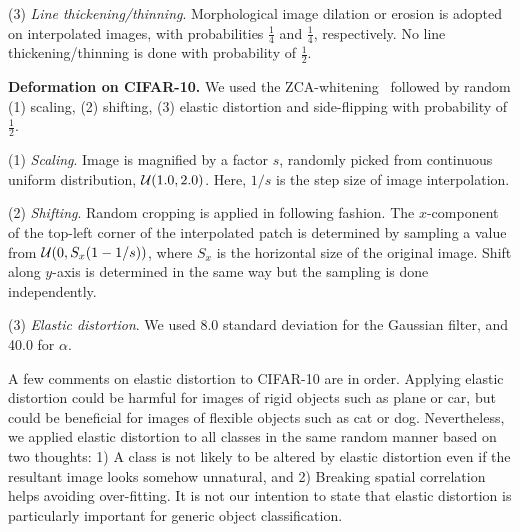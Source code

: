 \documentclass[10pt,twocolumn,letterpaper]{article}
\begin{document}
\noindent
(3) {\it Line thickening/thinning}.
Morphological image dilation or erosion is adopted on 
interpolated images, with probabilities $\frac{1}{4}$ and $\frac{1}{4}$,
respectively.
No line thickening/thinning is done with probability of $\frac{1}{2}$.

{\bf Deformation on CIFAR-10.}
We used the ZCA-whitening~\cite{KrizhevskyMasterThesis} 
followed by random (1) scaling, (2) shifting, (3) elastic distortion and side-flipping with probability of $\frac{1}{2}$.


\noindent
(1) {\it Scaling}.
Image is magnified by a factor $s$, randomly picked from continuous uniform distribution, ${\cal U}(1.0, 2.0)$.
Here, $1/s$ is the step size of image interpolation.

\noindent
(2) {\it Shifting}.
Random cropping is applied in following fashion.
The $x$-component of the top-left corner of the interpolated patch is determined by 
sampling a value from ${\cal U}(0, S_x (1-1/s))$,
where $S_x$ is the horizontal size of the original image.
Shift along $y$-axis is determined in the same way but the sampling is done independently.

\noindent
(3) {\it Elastic distortion}.
We used 8.0 standard deviation for the Gaussian filter, and 40.0 for $\alpha$.

A few comments on elastic distortion to CIFAR-10 are in order.
Applying elastic distortion could be harmful for 
images of rigid objects such as plane or car, 
but could be beneficial for images of flexible objects
such as cat or dog.
Nevertheless, we applied elastic distortion to all classes in the same random manner based on two thoughts:
1) A class is not likely to be 
altered by elastic distortion even if 
the resultant image looks somehow unnatural, and 
2) Breaking spatial correlation helps avoiding over-fitting.
It is not our intention to state that 
elastic distortion is particularly important for generic object classification.
\end{document}
